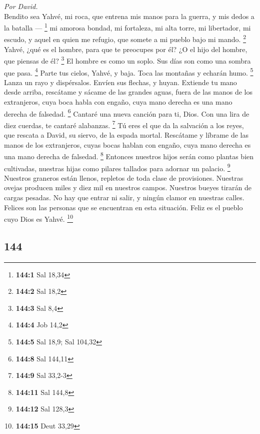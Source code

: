 \begin{paracol}{2}
\emph{Por David.}\\
 Bendito sea Yahvé, mi roca, que entrena mis manos para la
guerra, y mis dedos a la batalla --- \footnote{\textbf{144:1} Sal 18,34}
 mi amorosa bondad, mi fortaleza, mi alta torre, mi
libertador, mi escudo, y aquel en quien me refugio, que somete a mi
pueblo bajo mi mando. \footnote{\textbf{144:2} Sal 18,2} 
Yahvé, ¿qué es el hombre, para que te preocupes por él? ¿O el hijo del
hombre, que piensas de él? \footnote{\textbf{144:3} Sal 8,4}
 El hombre es como un soplo. Sus días son como una sombra
que pasa. \footnote{\textbf{144:4} Job 14,2}  Parte tus
cielos, Yahvé, y baja. Toca las montañas y echarán humo. \footnote{\textbf{144:5}
  Sal 18,9; Sal 104,32}  Lanza un rayo y dispérsalos.
Envíen sus flechas, y huyan.  Extiende tu mano desde
arriba, rescátame y sácame de las grandes aguas, fuera de las manos de
los extranjeros,  cuya boca habla con engaño, cuya mano
derecha es una mano derecha de falsedad. \footnote{\textbf{144:8} Sal
  144,11}  Cantaré una nueva canción para ti, Dios. Con
una lira de diez cuerdas, te cantaré alabanzas. \footnote{\textbf{144:9}
  Sal 33,2-3}  Tú eres el que da la salvación a los
reyes, que rescata a David, su siervo, de la espada mortal.
 Rescátame y líbrame de las manos de los extranjeros,
cuyas bocas hablan con engaño, cuya mano derecha es una mano derecha de
falsedad. \footnote{\textbf{144:11} Sal 144,8}  Entonces
nuestros hijos serán como plantas bien cultivadas, nuestras hijas como
pilares tallados para adornar un palacio. \footnote{\textbf{144:12} Sal
  128,3}  Nuestros graneros están llenos, repletos de
toda clase de provisiones. Nuestras ovejas producen miles y diez mil en
nuestros campos.  Nuestros bueyes tirarán de cargas
pesadas. No hay que entrar ni salir, y ningún clamor en nuestras calles.
 Felices son las personas que se encuentran en esta
situación. Feliz es el pueblo cuyo Dios es Yahvé. \footnote{\textbf{144:15}
  Deut 33,29}

\switchcolumn
\begin{otherlanguage}{english}

\hypertarget{section-287}{%
\section{144}\label{section-287}}


\end{otherlanguage}
\end{paracol}
